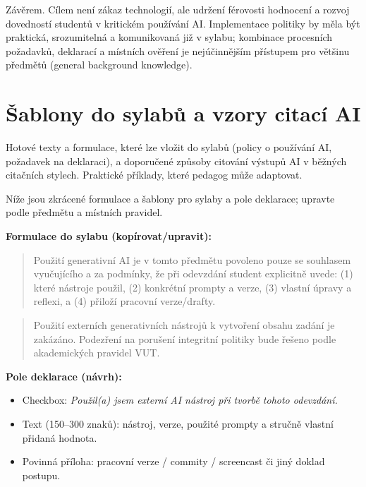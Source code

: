 \documentclass{report}%
\begin{document}
Závěrem. Cílem není zákaz technologií, ale udržení férovosti hodnocení a rozvoj dovedností studentů v kritickém používání AI. Implementace politiky by měla být praktická, srozumitelná a komunikovaná již v sylabu; kombinace procesních požadavků, deklarací a místních ověření je nejúčinnějším přístupem pro většinu předmětů (general background knowledge).%

%
\section{Šablony do sylabů a vzory citací AI}%
Hotové texty a formulace, které lze vložit do sylabů (policy o používání AI, požadavek na deklaraci), a doporučené způsoby citování výstupů AI v běžných citačních stylech. Praktické příklady, které pedagog může adaptovat.%


%
Níže jsou zkrácené formulace a šablony pro sylaby a pole deklarace; upravte podle předmětu a místních pravidel.

\bigskip

\textbf{Formulace do sylabu (kopírovat/upravit):}

\begin{quote}
\begin{PromptBlock}


Použití generativní AI je v tomto předmětu povoleno pouze se souhlasem vyučujícího a za podmínky, že při odevzdání student explicitně uvede: (1) které nástroje použil, (2) konkrétní prompty a verze, (3) vlastní úpravy a reflexi, a (4) přiloží pracovní verze/drafty.
\end{PromptBlock}


\end{quote}

\begin{quote}
\begin{PromptBlock}


Použití externích generativních nástrojů k vytvoření obsahu zadání je zakázáno. Podezření na porušení integritní politiky bude řešeno podle akademických pravidel VUT.
\end{PromptBlock}


\end{quote}

\bigskip

\textbf{Pole deklarace (návrh):}
\begin{itemize}
  \item Checkbox: \textit{Použil(a) jsem externí AI nástroj při tvorbě tohoto odevzdání.}
  \item Text (150–300 znaků): nástroj, verze, použité prompty a stručně vlastní přidaná hodnota.
  \item Povinná příloha: pracovní verze / commity / screencast či jiný doklad postupu.
\end{itemize}
\end{document}
